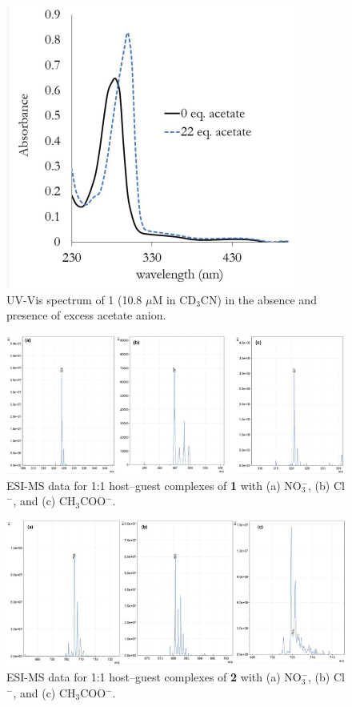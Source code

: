 \begin{figure}
    \centering
    \includegraphics[width=0.8\linewidth]{figures/pub2/si_fig5.png}
    \caption{UV-Vis spectrum of 1 (10.8 $\mu$M in CD$_{3}$CN) in the absence and presence of excess acetate anion.}\label{fig:uvvis}
\end{figure}

\begin{figure}
    \centering
    \includegraphics[width=0.8\linewidth]{figures/pub2/si_fig6.png}
    \caption{ESI-MS data for 1:1 host–guest complexes of \textbf{1} with (a) NO$_{3}^{-}$, (b) Cl$^{-}$, and (c) CH$_{3}$COO$^{-}$.}\label{fig:esi1}
\end{figure}

\begin{figure}
    \centering
    \includegraphics[width=0.8\linewidth]{figures/pub2/si_fig7.png}
    \caption{ESI-MS data for 1:1 host–guest complexes of \textbf{2} with (a) NO$_{3}^{-}$, (b) Cl$^{-}$, and (c) CH$_{3}$COO$^{-}$.}\label{fig:esi2}
\end{figure}

